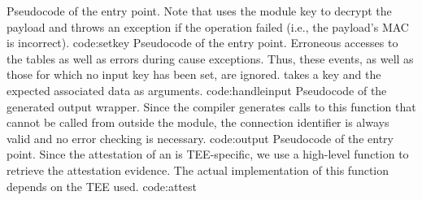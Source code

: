 %
  {Pseudocode of the \setkey{} entry point. Note that \unwrap{} uses the module
  key to decrypt the payload and throws an exception if the operation failed
  (i.e., the payload's \acs{MAC} is incorrect).\label{code:setkey}}%
  {code:setkey}
%
%
%
  {Pseudocode of the \handleinput{} entry point. Erroneous accesses to the
  tables as well as errors during \unwrap{} cause exceptions. Thus, these
  events, as well as those for which no input key has been set, are ignored.
  \unwrap{} takes a key and the expected associated data as arguments.}%
  {code:handleinput}
%
%
%
  {Pseudocode of the generated output wrapper. Since the compiler generates
  calls to this function that cannot be called from outside the module, the
  connection identifier is always valid and no error checking is
  necessary.}%
  {code:output} 
%
%
%
  {Pseudocode of the \attest{} entry point. Since the attestation of an
  \protmod{} is \ac{TEE}-specific, we use a high-level function \genattevid{} to
  retrieve the attestation evidence. The actual implementation of this function
  depends on the \ac{TEE} used.}%
  {code:attest} 